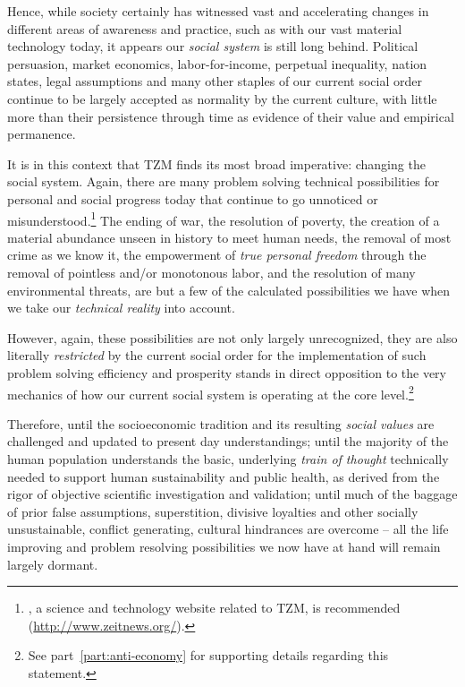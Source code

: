 \documentclass[10pt, a4paper, cleardoubleempty, openright, twoside]{book}
\begin{document}
Hence, while society certainly has witnessed vast and accelerating
changes in different areas of awareness and practice, such as with our
vast material technology today, it appears our \emph{social system} is
still long behind. Political persuasion, market economics,
labor-for-income, perpetual inequality, nation states, legal assumptions
and many other staples of our current social order continue to be
largely accepted as normality by the current culture, with little more
than their persistence through time as evidence of their value and
empirical permanence.

It is in this context that TZM finds its most broad imperative: changing
the social system. Again, there are many problem solving technical
possibilities for personal and social progress today that continue to go
unnoticed or misunderstood.\footnote{
	, a science and technology website related to TZM,
	is recommended (\url{http://www.zeitnews.org/}).
} 
The ending of war, the resolution of poverty, the creation of a
material abundance unseen in history to meet human needs, the removal of
most crime as we know it, the empowerment of \emph{true personal
freedom} through the removal of pointless and/or monotonous labor, and
the resolution of many environmental threats, are but a few of the
calculated possibilities we have when we take our \emph{technical
reality} into account.

However, again, these possibilities are not only largely unrecognized,
they are also literally \emph{restricted} by the current social order
for the implementation of such problem solving efficiency and prosperity
stands in direct opposition to the very mechanics of how our current
social system is operating at the core level.\footnote{
	See part~\ref{part:anti-economy} for supporting details regarding this
	statement.
}

Therefore, until the socioeconomic tradition and its resulting
\emph{social values} are challenged and updated to present day
understandings; until the majority of the human population understands
the basic, underlying \emph{train of thought} technically needed to
support human sustainability and public health, as derived from the
rigor of objective scientific investigation and validation; until much
of the baggage of prior false assumptions, superstition, divisive
loyalties and other socially unsustainable, conflict generating,
cultural hindrances are overcome -- all the life improving and problem
resolving possibilities we now have at hand will remain largely dormant.
\end{document}
